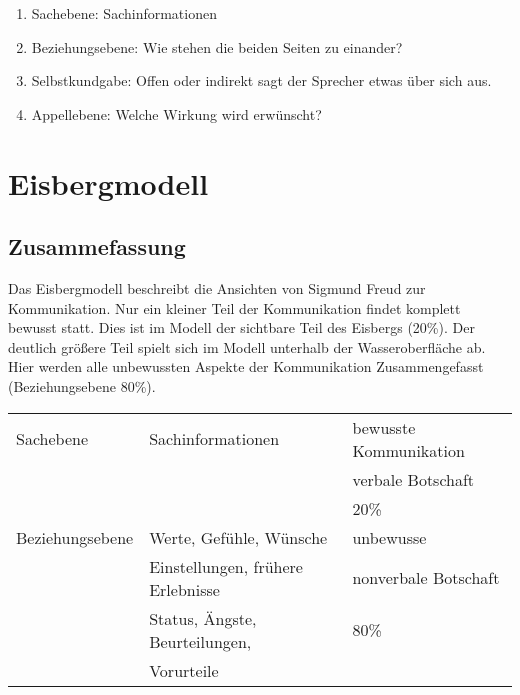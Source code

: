 \documentclass[11pt]{article}
\begin{document}
\begin{enumerate}
\item Sachebene: Sachinformationen
\item Beziehungsebene: Wie stehen die beiden Seiten zu einander?
\item Selbstkundgabe: Offen oder indirekt sagt der Sprecher etwas über sich aus.
\item Appellebene: Welche Wirkung wird erwünscht?
\end{enumerate}
\section{Eisbergmodell}
\label{sec:orgddf6a60}
\subsection{Zusammefassung}
\label{sec:org288f416}
Das Eisbergmodell beschreibt die Ansichten von Sigmund Freud zur Kommunikation.
Nur ein kleiner Teil der Kommunikation findet komplett bewusst statt. Dies ist im Modell der sichtbare Teil des Eisbergs (20\%).
Der deutlich größere Teil spielt sich im Modell unterhalb der Wasseroberfläche ab. Hier werden alle unbewussten Aspekte der Kommunikation Zusammengefasst (Beziehungsebene 80\%).

\begin{center}
\begin{tabular}{lll}
\hline
Sachebene & Sachinformationen & bewusste Kommunikation\\
 &  & verbale Botschaft\\
 &  & 20\%\\
\hline
Beziehungsebene & Werte, Gefühle, Wünsche & unbewusse\\
 & Einstellungen, frühere Erlebnisse & nonverbale Botschaft\\
 & Status, Ängste, Beurteilungen, & 80\%\\
 & Vorurteile & \\
\hline
\end{tabular}
\end{center}
\end{document}
